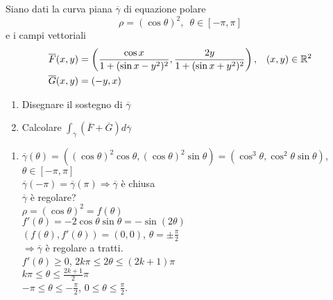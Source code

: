 \begin{exbar}
\begin{example}
	Siano dati la curva piana $\overline{\gamma}$ di equazione polare
	\begin{equation*}
		\rho = (\cos \theta)^2,\,\,\, \theta \in[-\pi,\pi] 
	\end{equation*}
	e i campi vettoriali
	\begin{align*}
		\overline{F}(x,y)&=\left( \frac{\cos x}{1+(\sin x-y^2)^2},\frac{2y}{1+(\sin x + y^2)^2} \right),\,\,\,\,\,(x,y) \in \mathbb{R}^2 \\
		\overline{G}(x,y)&= (-y,x)
	\end{align*}
	\begin{enumerate}
		\item Disegnare il sostegno di $\overline{\gamma}$
		\item Calcolare $\int_{\overline{\gamma}}(\overline{F}+\overline{G})d\overline{\gamma}$
	\end{enumerate}
	\begin{enumerate}
		\item $\overline{\gamma}(\theta)=((\cos \theta)^2\cos \theta, (\cos \theta)^2 \sin \theta)=(\cos^3 \theta, \cos ^2 \theta \sin \theta)$, $\theta \in [-\pi,\pi]$\\
		$\overline{\gamma}(-\pi)=\overline{\gamma}(\pi)\Rightarrow \overline{\gamma}$ è chiusa\\
		$\overline{\gamma}$ è regolare?\\
		$\rho=(\cos \theta )^2=f(\theta)$\\
		$f'(\theta)=-2\cos \theta \sin \theta=-\sin(2\theta)$\\
		$(f(\theta), f'(\theta))=(0,0)$, $\theta = \pm\frac{\pi}{2}$\\
		$\Rightarrow \overline{\gamma} $ è regolare a tratti.\\
		$f'(\theta) \geq 0$, $2k\pi \leq 2\theta \leq (2k+1)\pi$\\
		$k\pi \leq \theta \leq \frac{2k+1}{2}\pi$\\
		$-\pi \leq \theta \leq -\frac{\pi}{2}$, $0 \leq \theta \leq \frac{\pi}{2}$.\\

		\segnaposto %


\end{enumerate}
\end{example}
\end{exbar}
